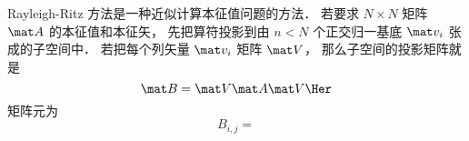 
\begin{issues}
\issueDraft
\end{issues}

Rayleigh-Ritz 方法是一种近似计算本征值问题的方法． 若要求 $N\times N$ 矩阵 $\mat A$ 的本征值和本征矢， 先把算符投影到由 $n < N$ 个正交归一基底 $\mat v_i$ 张成的子空间中． 若把每个列矢量 $\mat v_i$ 矩阵 $\mat V$， 那么子空间的投影矩阵就是
\begin{equation}
\mat B = \mat V \mat A \mat V\Her
\end{equation}
矩阵元为
\begin{equation}
B_{i,j} = 
\end{equation}

